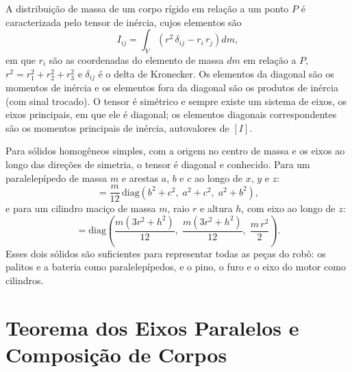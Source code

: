 A distribuição de massa de um corpo rígido em relação a um ponto $P$ é caracterizada pelo tensor de inércia, cujos elementos são
\begin{equation}
  I_{ij} = \int_V \left( r^{2}\,\delta_{ij} - r_i\,r_j \right) dm ,
  \label{eq:tensor}
\end{equation}
em que $r_i$ são as coordenadas do elemento de massa $dm$ em relação a $P$, $r^2=r_1^2+r_2^2+r_3^2$ e $\delta_{ij}$ é o delta de Kronecker. Os elementos da diagonal são os momentos de inércia e os elementos fora da diagonal são os produtos de inércia (com sinal trocado). O tensor é simétrico e sempre existe um sistema de eixos, os eixos principais, em que ele é diagonal; os elementos diagonais correspondentes são os momentos principais de inércia, autovalores de $[I]$.

Para sólidos homogêneos simples, com a origem no centro de massa e os eixos ao longo das direções de simetria, o tensor é diagonal e conhecido. Para um paralelepípedo de massa $m$ e arestas $a$, $b$ e $c$ ao longo de $x$, $y$ e $z$:
\begin{equation}
  [I^*_{par}] = \frac{m}{12}\,\mathrm{diag}\!\left(b^{2}+c^{2},\; a^{2}+c^{2},\; a^{2}+b^{2}\right),
  \label{eq:Ipar}
\end{equation}
e para um cilindro maciço de massa $m$, raio $r$ e altura $h$, com eixo ao longo de $z$:
\begin{equation}
  [I^*_{cil}] = \mathrm{diag}\!\left(\frac{m(3r^{2}+h^{2})}{12},\; \frac{m(3r^{2}+h^{2})}{12},\; \frac{m\,r^{2}}{2}\right).
  \label{eq:Icil}
\end{equation}
Esses dois sólidos são suficientes para representar todas as peças do robô: os palitos e a bateria como paralelepípedos, e o pino, o furo e o eixo do motor como cilindros.

\section{\textbf{Teorema dos Eixos Paralelos e Composição de Corpos}}
\label{sec:composicao}

